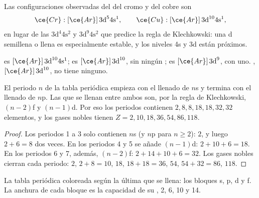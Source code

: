 \begin{proposition}\label{prop:b1:quantum-numbers:exceptions}
Las configuraciones observadas del  del cromo y del
cobre son
\[
  \ce{Cr}: [\ce{Ar}]\,3\text{d}^5 4\text{s}^1, \qquad
  \ce{Cu}: [\ce{Ar}]\,3\text{d}^{10} 4\text{s}^1 ,
\]
en lugar de las $3\text{d}^4 4\text{s}^2$ y $3\text{d}^9 4\text{s}^2$
que predice la regla de Klechkowski: una  d semillena o llena es
especialmente estable, y los niveles 4s y 3d están próximos.
\end{proposition}

\begin{example}\label{ex:b1:quantum-numbers:copper}
 es $[\ce{Ar}]\,3\text{d}^{10} 4\text{s}^1$;  es
$[\ce{Ar}]\,3\text{d}^{10}$, sin ningún ; 
es $[\ce{Ar}]\,3\text{d}^9$, con uno. , $[\ce{Ar}]\,3\text{d}^{10}$,
no tiene ninguno.
\end{example}

\begin{proposition}\label{prop:b1:quantum-numbers:table}
El periodo $n$ de la tabla periódica empieza con el llenado de $n$s y
termina con el llenado de $n$p. Las  que se llenan entre ambos
son, por la regla de Klechkowski, $(n-2)$f y $(n-1)$d. Por eso los
periodos contienen
$2, 8, 8, 18, 18, 32, 32$ elementos, y los gases nobles tienen $Z = 2, 10,
18, 36, 54, 86, 118$.
\end{proposition}

\begin{proof}
Los periodos 1 a 3 solo contienen $n$s (y $n$p para $n \ge 2$): $2$, y
luego $2 + 6 = 8$ dos veces. En los periodos 4 y 5 se añade $(n-1)$d:
$2 + 10 + 6 =
18$. En los periodos 6 y 7, además, $(n-2)$f: $2 + 14 + 10 + 6 = 32$. Los
gases nobles cierran cada periodo: $2$, $2 + 8 = 10$, $18$, $18 + 18 = 36$,
$54$, $54 + 32 = 86$, $118$.
\end{proof}

\begin{omfigure}
\omperiodictable[colour=blocks, legend]

{\small La tabla periódica coloreada según la última  que se llena:
los bloques s, p, d y f. La anchura de cada bloque es la capacidad de su
, 2, 6, 10 y 14.}
\end{omfigure}

